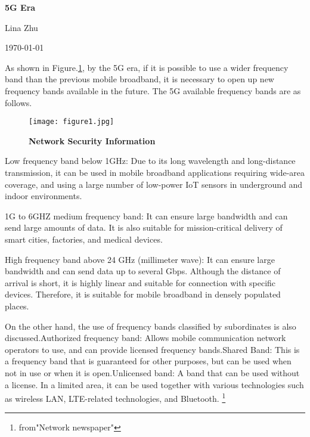 \documentclass[a4paper,12pt,twocolumn]{article}
\begin{document}
	\begin{center}
		
		{\bfseries \LARGE 5G Era} 
	\end{center}
	\begin{center}
		Lina Zhu
	\end{center}
	\begin{center}
		\today
	\end{center}
	\par As shown in Figure.\ref{pic1}, by the 5G era, if it is possible to use a wider frequency band than the previous mobile broadband, it is necessary to open up new frequency bands available in the future. The 5G available frequency bands are as follows.
		\begin{figure}[htp]
		\centering
		\texttt{[image: figure1.jpg]}
		\caption{\bfseries{Network Security Information}}\label{pic1}
	\end{figure}
	\par Low frequency band below 1GHz: Due to its long wavelength and long-distance transmission, it can be used in mobile broadband applications requiring wide-area coverage, and using a large number of low-power IoT sensors in underground and indoor environments.
	\par 1G to 6GHZ medium frequency band: It can ensure large bandwidth and can send large amounts of data. It is also suitable for mission-critical delivery of smart cities, factories, and medical devices.
\par 	High frequency band above 24 GHz (millimeter wave): It can ensure large bandwidth and can send data up to several Gbps. Although the distance of arrival is short, it is highly linear and suitable for connection with specific devices. Therefore, it is suitable for mobile broadband in densely populated places.
\par	On the other hand, the use of frequency bands classified by subordinates is also discussed.Authorized frequency band: Allows mobile communication network operators to use, and can provide licensed frequency bands.Shared Band: This is a frequency band that is guaranteed for other purposes, but can be used when not in use or when it is open.Unlicensed band: A band that can be used without a license. In a limited area, it can be used together with various technologies such as wireless LAN, LTE-related technologies, and Bluetooth.
\footnote{from"Network newspaper"} 


	
\end{document}
